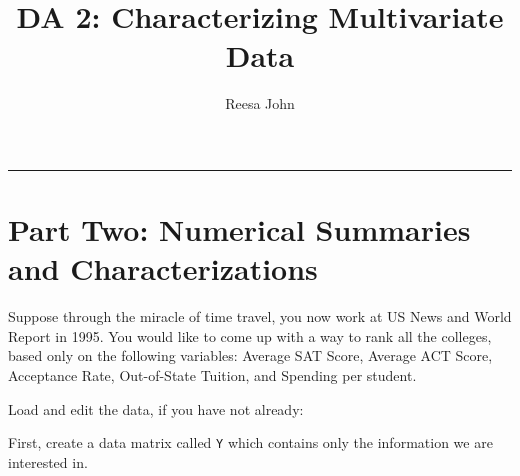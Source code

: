 \documentclass[]{article}
\title{DA 2: Characterizing Multivariate Data}
\author{Reesa John}
\date{}
\newenvironment{Shaded}{\begin{snugshade}}{\end{snugshade}}
\newcommand{\KeywordTok}[1]{\textcolor[rgb]{0.13,0.29,0.53}{\textbf{#1}}}
\newcommand{\DataTypeTok}[1]{\textcolor[rgb]{0.13,0.29,0.53}{#1}}
\newcommand{\StringTok}[1]{\textcolor[rgb]{0.31,0.60,0.02}{#1}}
\newcommand{\CommentTok}[1]{\textcolor[rgb]{0.56,0.35,0.01}{\textit{#1}}}
\newcommand{\OperatorTok}[1]{\textcolor[rgb]{0.81,0.36,0.00}{\textbf{#1}}}
\newcommand{\NormalTok}[1]{#1}
\begin{document}
\maketitle

\begin{center}\rule{0.5\linewidth}{\linethickness}\end{center}

\section{Part Two: Numerical Summaries and
Characterizations}\label{part-two-numerical-summaries-and-characterizations}

Suppose through the miracle of time travel, you now work at US News and
World Report in 1995. You would like to come up with a way to rank all
the colleges, based only on the following variables: Average SAT Score,
Average ACT Score, Acceptance Rate, Out-of-State Tuition, and Spending
per student.

Load and edit the data, if you have not already:

\begin{Shaded}
\end{Shaded}

First, create a data matrix called \texttt{Y} which contains only the
information we are interested in.
\end{document}
